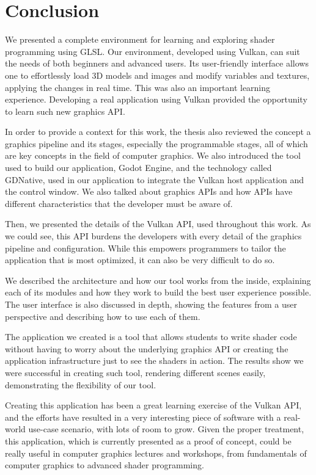 \chapter{Conclusion}
We presented a complete environment for learning and exploring shader
programming using GLSL. Our environment, developed using Vulkan, can suit the needs of both beginners and advanced users. Its user-friendly interface allows one to effortlessly load 3D models and images and modify variables and textures, applying the changes in real time. This was also an important learning experience. Developing a real application using  Vulkan provided the opportunity to learn such new graphics API. 

In order to provide a context for this work, the thesis also reviewed the concept a graphics pipeline and its stages, especially the programmable stages, all of which are key concepts in the field of computer graphics. We also introduced the tool used to build our application, Godot Engine, and the technology called GDNative, used in our application to integrate the Vulkan host application and the control window. We also talked about graphics APIs and how APIs have different characteristics that the developer must be aware of.

Then, we presented the details of the Vulkan API, used throughout this work. As we could see, this API burdens the developers with every detail of the graphics pipeline and configuration. While this empowers programmers to tailor the application that is most optimized, it can also be very difficult to do so.

We described the architecture and how our tool works from the inside, explaining each of its modules and how they work to build the best user experience possible. The user interface is also discussed in depth, showing the features from a user perspective and describing how to use each of them.

The application we created is a tool that allows students to write shader code without having to worry about the underlying graphics API or creating the application infrastructure just to see the shaders in action. The results show we were successful in creating such tool, rendering different scenes easily, demonstrating the flexibility of our tool.

Creating this application has been a great learning exercise of the Vulkan API, and the efforts have resulted in a very interesting piece of software with a real-world use-case scenario, with lots of room to grow. Given the proper treatment, this application, which is currently presented as a proof of concept, could be really useful in computer graphics lectures and workshops, from fundamentals of computer graphics to advanced shader programming.
